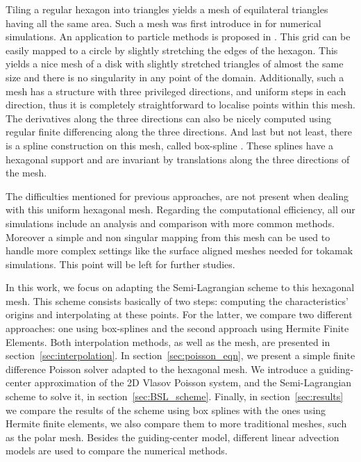 \documentclass[proc]{edpsmath}
\begin{document}
Tiling a regular hexagon into triangles yields a mesh of equilateral triangles having all the same area.
Such a mesh was first introduce in \cite{Sadourny1968} for numerical simulations. An application to particle methods is proposed in \cite{chatelain2008isotropic}.
This grid can be easily mapped to a circle by slightly stretching the edges of the hexagon. This yields a nice mesh of a disk with slightly stretched triangles of almost the same size and there is no singularity in any point of the domain. 
Additionally, such a mesh has a structure with three privileged directions, and uniform steps in each direction, thus it is completely straightforward to localise points within this mesh. The derivatives along the three directions can also be nicely computed using regular finite differencing along the three directions. 
And last but not least, there is a spline construction on this mesh, called box-spline \cite{Condat2008}. These splines have a hexagonal support and are invariant by translations along the three directions of the mesh. 

The difficulties mentioned for previous approaches, are not present when dealing with this uniform hexagonal mesh. Regarding the computational efficiency, all our simulations include an analysis and comparison with more common methods. 
Moreover a simple and non singular mapping from this mesh can be used  to handle more complex settings
like the surface aligned meshes needed for tokamak simulations. This point will be left for further studies.

In this work, we focus on adapting the Semi-Lagrangian scheme to this hexagonal mesh. This scheme consists basically of two steps: computing the characteristics' origins and interpolating at these points. For the latter, we compare two different approaches: one using box-splines and the second approach using Hermite Finite Elements. Both interpolation methods, as well as the mesh, are presented in section~\ref{sec:interpolation}. In section~\ref{sec:poisson_eqn}, we present a simple finite difference Poisson solver adapted to the hexagonal mesh. We introduce a guiding-center approximation of the 2D Vlasov Poisson system\cite{Golse1998865}, and the Semi-Lagrangian scheme to solve it, in section~\ref{sec:BSL_scheme}. Finally, in section~\ref{sec:results} we compare the results of the scheme using box splines with the ones using Hermite finite elements, we also compare them to more traditional meshes, such as the polar mesh. Besides the guiding-center model, different linear advection models are used to compare the numerical methods.
\end{document}
